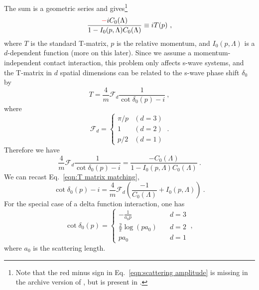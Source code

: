 \documentclass[11pt]{article}
\begin{document}
\noindent The sum is a geometric series and gives\footnote{Note that the {\color{red} red} minus sign in Eq.~\eqref{eqn:scattering amplitude} is missing in the archive version of \cite{Beane:2003da}, but is present in \cite{Kaplan:1998we}.}
\begin{equation}\label{eqn:scattering amplitude}
\frac{{\color{red}-}iC_0(\Lambda)}{1-I_0(p,\Lambda)C_0(\Lambda)}\equiv iT(p)\ ,
\end{equation}
where $T$ is the standard T-matrix, $p$ is the relative momentum,  and $I_0(p,\Lambda)$ is a $d$-dependent function (more on this later).  Since we assume a momentum-independent contact interaction, this problem only affects s-wave systems, and the T-matrix in $d$ spatial dimensions can be related to the s-wave phase shift $\delta_0$ by
\begin{equation}
T=\frac{4}{m}\mathcal{F}_d\frac{1}{\cot \delta_0(p)-i}\ ,
\end{equation}
where
\begin{equation}
\mathcal{F}_d=
\begin{cases}
\pi/p & (d=3)\\
1 & (d=2)\\
p/2 & (d=1)
\end{cases}\ .
\end{equation}
Therefore we have
\begin{equation}\label{eqn:T matrix matching}
\boxed{
\frac{4}{m}\mathcal{F}_d\frac{1}{\cot \delta_0(p)-i}=\frac{-C_0(\Lambda)}{1-I_0(p,\Lambda)C_0(\Lambda)}
}\ .
\end{equation}
We can recast Eq.~\eqref{eqn:T matrix matching},
\begin{equation}\label{eqn:matching}
\cot \delta_0(p)-i=\frac{4}{m}\mathcal{F}_d\left(\frac{-1}{C_0(\Lambda)}+I_0(p,\Lambda)\right)\ .
\end{equation}
For the special case of a delta function interaction, one has \cite{busch1998}
\begin{equation}\label{eqn:phase shifts}
\cot \delta_0(p) = 
\begin{cases}
 - \frac{1}{a _ { 0 }p }&\quad d=3  \\ 
\frac { 2 } { \pi } \log \left( p a _ { 0 } \right) & \quad d=2\\ 
 p a _ { 0 } &\quad d=1
 \end{cases}\ ,
\end{equation}
where $a_0$ is the scattering length.

\end{document}
